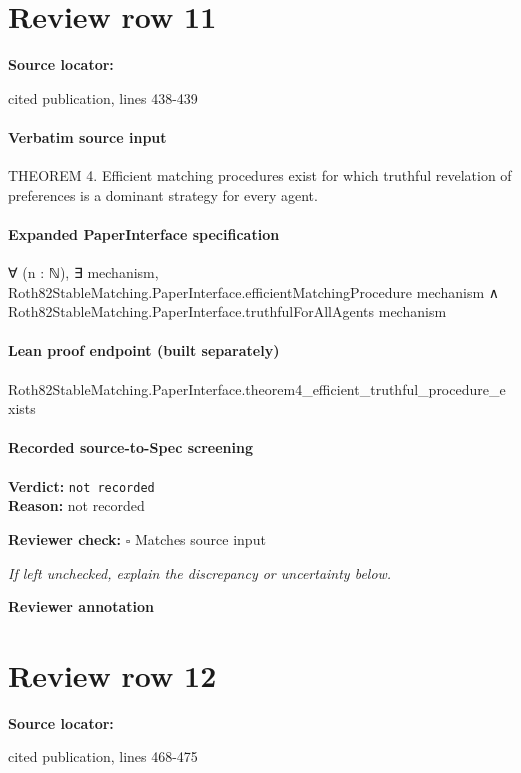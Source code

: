 \documentclass[10pt]{article}
\newcommand{\reviewerbox}{%
  \par\noindent\fbox{\parbox{0.96\linewidth}{\rule{0pt}{0.38in}}}\par
}
\newcommand{\reviewmatch}[1]{%
  \par\noindent\textbf{Reviewer check:} $\square$\; #1\par
  \noindent\emph{If left unchecked, explain the discrepancy or uncertainty below.}\par
}
\begin{document}
\section*{Review row 11}
\textbf{Source locator:} {\footnotesize\raggedright cited publication, lines 438-\allowbreak{}439\par}
\paragraph{Verbatim source input}
\begin{ReviewVerbatim}
THEOREM 4. Efficient matching procedures exist for which truthful revelation of
preferences is a dominant strategy for every agent.
\end{ReviewVerbatim}


\paragraph{Expanded PaperInterface specification}
\begin{ReviewVerbatim}
∀ (n : ℕ),
  ∃ mechanism,
    Roth82StableMatching.PaperInterface.efficientMatchingProcedure mechanism ∧
      Roth82StableMatching.PaperInterface.truthfulForAllAgents mechanism
\end{ReviewVerbatim}

\paragraph{Lean proof endpoint (built separately)}\begin{ReviewVerbatim}
Roth82StableMatching.PaperInterface.theorem4_efficient_truthful_procedure_exists
\end{ReviewVerbatim}

\paragraph{Recorded source-to-Spec screening}
\textbf{Verdict:} \texttt{not recorded}
\\
\textbf{Reason:} not recorded
\reviewmatch{Matches source input}
\noindent\textbf{Reviewer annotation}\par
\reviewerbox
\clearpage
\hypertarget{source-claim-20d2db0d61f9b81c}{}
\section*{Review row 12}
\textbf{Source locator:} {\footnotesize\raggedright cited publication, lines 468-\allowbreak{}475\par}
\end{document}
